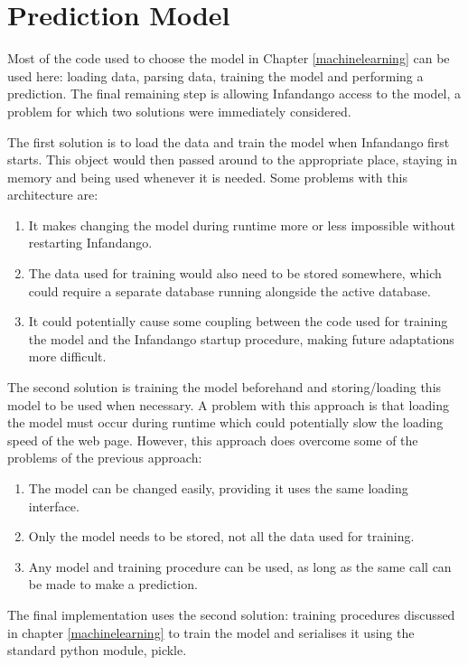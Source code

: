 \section{Prediction Model}
Most of the code used to choose the model in Chapter \ref{machinelearning} can be used here: loading data, parsing data, training the model and performing a prediction. The final remaining step is allowing Infandango access to the model, a problem for which two solutions were immediately considered.

The first solution is to load the data and train the model when Infandango first starts. This object would then passed around to the appropriate place, staying in memory and being used whenever it is needed. Some problems with this architecture are:

\begin{enumerate}
\item It makes changing the model during runtime more or less impossible without restarting Infandango.
\item The data used for training would also need to be stored somewhere, which could require a separate database running alongside the active database.
\item It could potentially cause some coupling between the code used for training the model and the Infandango startup procedure, making future adaptations more difficult.
\end{enumerate}

The second solution is training the model beforehand and storing/loading this model to be used when necessary. A problem with this approach is that loading the model must occur during runtime which could potentially slow the loading speed of the web page. However, this approach does overcome some of the problems of the previous approach: 

\begin{enumerate}
\item The model can be changed easily, providing it uses the same loading interface.
\item Only the model needs to be stored, not all the data used for training.
\item Any model and training procedure can be used, as long as the same call can be made to make a prediction.
\end{enumerate}

The final implementation uses the second solution: training procedures discussed in chapter \ref{machinelearning} to train the model and serialises it using the standard python module, pickle\cite{pythonpickle_site}.

